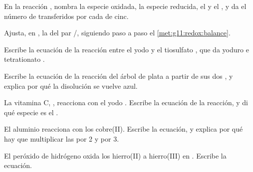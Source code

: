 \begin{exercise}[$\star$]\label{exo:g11:redox:5}
En la reacción , nombra la especie
oxidada, la especie reducida, el  y el , y da el número
de  transferidos por cada  de cinc.
\end{exercise}

\begin{exercise}[$\star\star$]\label{exo:g11:redox:6}
Ajusta, en , la  del par
/, siguiendo paso a paso el
\cref{met:g11:redox:balance}.
\end{exercise}

\begin{exercise}[$\star\star$]\label{exo:g11:redox:7}
Escribe la ecuación de la reacción entre el yodo  y el 
tiosulfato , que da  yoduro e  tetrationato
.
\end{exercise}

\begin{exercise}[$\star\star$]\label{exo:g11:redox:8}
Escribe la ecuación de la reacción del árbol de plata a partir de sus
dos , y explica por qué la disolución se vuelve azul.
\end{exercise}

\begin{exercise}[$\star\star$]\label{exo:g11:redox:9}
La vitamina C, , reacciona con el yodo . Escribe la
ecuación de la reacción, y di qué especie es el .
\end{exercise}

\begin{exercise}[$\star\star$]\label{exo:g11:redox:10}
El aluminio reacciona con los  cobre(II). Escribe la ecuación, y
explica por qué hay que multiplicar las  por 2 y por 3.
\end{exercise}

\begin{exercise}[$\star\star$]\label{exo:g11:redox:11}
El peróxido de hidrógeno oxida los  hierro(II) a  hierro(III)
en . Escribe la ecuación.
\end{exercise}

